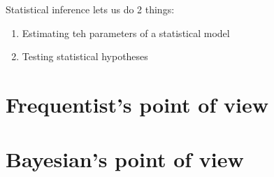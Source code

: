 Statistical inference lets us do 2 things:
\begin{enumerate}
	\item Estimating teh parameters of a statistical model
	\item Testing statistical hypotheses
\end{enumerate}
\section{Frequentist's point of view}


\section{Bayesian's point of view}

